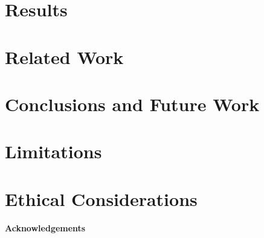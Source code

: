 \documentclass[11pt]{article}
\begin{document}
\label{subsec:research_questions}
\label{subsec:setup}









\section{Results}
\label{subsec:results}
















\section{Related Work}

\label{sec:related_work}

\section{Conclusions and Future Work}





\section*{Limitations}

\label{sec:limitations}




\section*{Ethical Considerations}




\paragraph{Acknowledgements}

\end{document}
